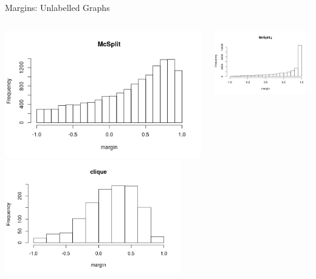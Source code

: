 \documentclass{beamer}
\begin{document}
\begin{frame}{Margins: Unlabelled Graphs}
  \begin{columns}[t]
    \begin{column}{0.5\textwidth}
      \centering
      \includegraphics[width=\textwidth,height=0.4\textheight,keepaspectratio]{../dissertation/images/mcsplit_hist.png}
      \includegraphics[width=0.9\textwidth,height=0.4\textheight,keepaspectratio]{../dissertation/images/clique_hist.png}
    \end{column}
    \begin{column}{0.5\textwidth}
      \centering
      \includegraphics[width=\textwidth,height=0.4\textheight,keepaspectratio]{../dissertation/images/mcsplitdown_hist.png}

\end{column}
\end{columns}
\end{frame}
\end{document}
